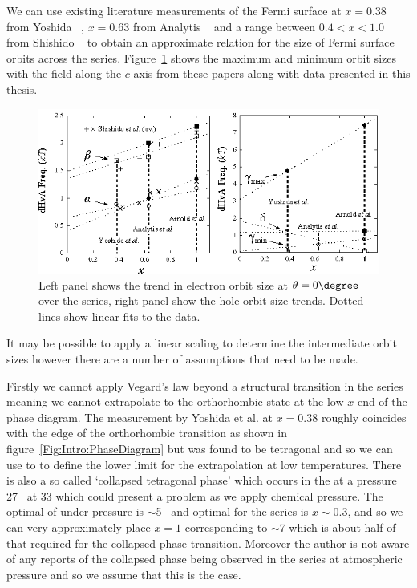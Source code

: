 We can use existing literature measurements of the Fermi surface at $x=0.38$ from Yoshida \etal~\cite{Yoshida2010}, $x=0.63$ from Analytis \etal~\cite{Analytis2010c} and a range between $0.4 < x < 1.0$ from Shishido \etal~\cite{Shishido2010} to obtain an approximate relation for the size of Fermi surface orbits across the \BaFePAs series. Figure~\ref{Fig:ResD:SeriesRecipe} shows the maximum and minimum orbit sizes with the field along the $c$-axis from these papers along with data presented in this thesis.
\begin{figure}[htbp]
    \begin{center}
        \includegraphics[scale=1.1]{Chapter-dHvABaFe2P2/Figures/AngleDepMeasurements/SeriesRecipe/SeriesRecipe}
        \caption{Left panel shows the trend in electron orbit size at $\theta=0\degree$ over the series, right panel show the hole orbit size trends. Dotted lines show linear fits to the data.}
        \label{Fig:ResD:SeriesRecipe}
    \end{center}
\end{figure}
It may be possible to apply a linear scaling to determine the intermediate orbit sizes however there are a number of assumptions that need to be made. 

Firstly we cannot apply Vegard's law beyond a structural transition in the series meaning we cannot extrapolate to the orthorhombic state at the low $x$ end of the phase diagram. The measurement by Yoshida et al. at $x=0.38$ roughly coincides with the edge of the orthorhombic transition as shown in figure~\ref{Fig:Intro:PhaseDiagram} but was found to be tetragonal and so we can use to to define the lower limit for the extrapolation at low temperatures. There is also a so called `collapsed tetragonal phase' which occurs in the \BaFeAs at a pressure \unit{27}{\giga\pascal}~\cite{Mittal2011} at \unit{33}{\kelvin} which could present a problem as we apply chemical pressure. The optimal \Tc of \BaFeAs under pressure is $\sim$\unit{5}{\giga\pascal}~\cite{Colombier2009} and optimal \Tc for the \BaFePAs series is $x\sim0.3$, and so we can very approximately place $x=1$ corresponding to $\sim$\unit{7}{\giga\pascal} which is about half of that required for the collapsed phase transition. Moreover the author is not aware of any reports of the collapsed phase being observed in the \BaFePAs series at atmospheric pressure and so we assume that this is the case. 

